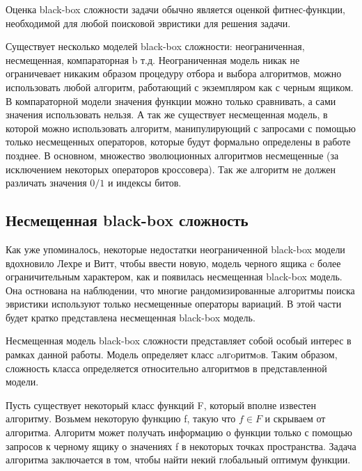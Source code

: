 Оценка black-box сложности задачи обычно является оценкой фитнес-функции, необходимой для любой поисковой эвристики для решения задачи.

Существует несколько моделей black-box сложности: неограниченная, несмещенная, компараторная b т.д. Неограниченная модель никак не ограничевает никаким образом процедуру отбора и выбора алгоритмов, можно использовать любой алгоритм, работающий с экземпляром как с черным ящиком. В компараторной модели значения функции можно только сравнивать, а сами значения использовать нельзя. А так же существует несмещенная модель, в которой можно использовать алгоритм, манипулирующий с запросами с помощью только несмещенных операторов, которые будут формально определены в работе позднее. В основном, множество эволюционных алгоритмов несмещенные (за исключением некоторых операторов кроссовера). Так же алгоритм не должен различать значения $0/1$ и индексы битов.

\subsection{Несмещенная black-box сложность}
Как уже упоминалось, некоторые недостатки неограниченной black-box модели вдохновило Лехре и Витт\cite{1}, чтобы ввести новую, модель черного ящика c более ограничительным характером, как и появилась несмещенная black-box модель. Она остнована на наблюдении, что многие рандомизированные алгоритмы поиска эвристики используют только несмещенные операторы вариаций. В этой части будет кратко представлена несмещенная black-box модель. 


Несмещенная модель black-box сложности  представляет собой особый интерес в рамках данной работы. Модель определяет класс aлгoритмoв. Таким образом, сложность класса определяется относительно алгоритмов в представленной модели.

Пусть существует некоторый класс функций F, который вполне известен алгоритму. Возьмем некоторую функцию f, такую что $f \in F$ и скрываем от алгоритма. Алгоритм может получать информацию о функции только с помощью запросов к черному ящику о значениях f в некоторых точках пространства. Задача алгоритма заключается в том, чтобы найти некий глобальный оптимум функции.




